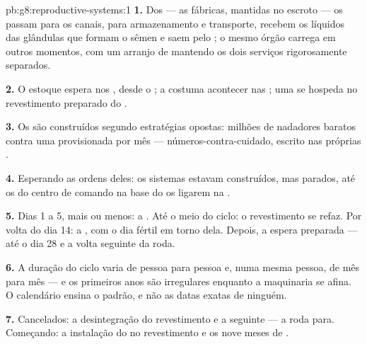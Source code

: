 \begin{solution}{pb:g8:reproductive-systems:1}
\textbf{1.} Dos  --- as fábricas, mantidas no escroto --- os
 passam para os canais, para armazenamento e
transporte, recebem os líquidos das glândulas que formam o sêmen e
saem pelo ; o mesmo órgão carrega  em outros momentos, com
um arranjo de  mantendo os dois serviços rigorosamente
separados.

\textbf{2.} O estoque espera nos , desde o ; a
 costuma acontecer nas ; uma  se
hospeda no revestimento preparado do .

\textbf{3.} Os  são construídos segundo estratégias opostas:
milhões de nadadores baratos contra uma  provisionada por mês ---
números-contra-cuidado, escrito nas próprias .

\textbf{4.} Esperando as ordens deles: os sistemas estavam construídos,
mas parados, até os  do centro de comando na base do 
os ligarem na .

\textbf{5.} Dias 1 a 5, mais ou menos: a . Até o meio do
ciclo: o revestimento se refaz. Por volta do dia 14: a , com o
dia fértil em torno dela. Depois, a espera preparada --- até o dia 28 e
a volta seguinte da roda.

\textbf{6.} A duração do ciclo varia de pessoa para pessoa e, numa
mesma pessoa, de mês para mês --- e os primeiros anos são irregulares
enquanto a maquinaria se afina. O calendário ensina o padrão, e não as
datas exatas de ninguém.

\textbf{7.} Cancelados: a desintegração do revestimento e a
 seguinte --- a roda para. Começando: a instalação do 
no revestimento e os nove meses de .


\end{solution}
